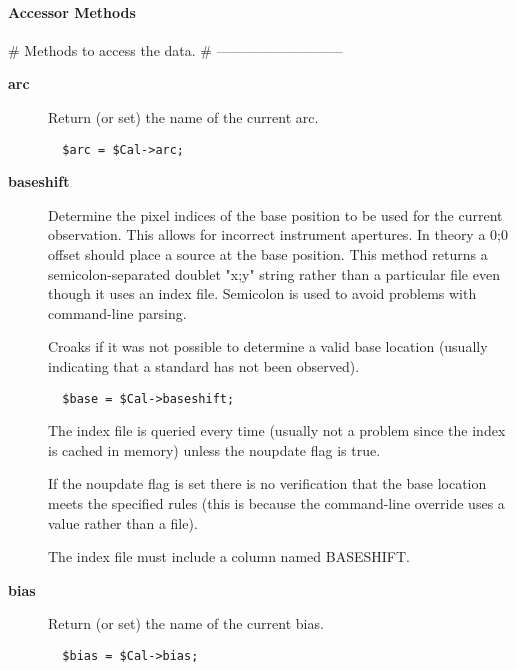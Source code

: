 \paragraph*{Accessor Methods\label{ORAC::Calib_Accessor_Methods}}


\# Methods to access the data.
\# ---------------------------

\begin{description}

\item[\textbf{arc}] \mbox{}

Return (or set) the name of the current arc.

\begin{verbatim}
  $arc = $Cal->arc;
\end{verbatim}

\item[\textbf{baseshift}] \mbox{}

Determine the pixel indices of the base position to be used for the
current observation.  This allows for incorrect instrument apertures.
In theory a 0;0 offset should place a source at the base position.
This method returns a semicolon-separated doublet "x;y" string rather
than a particular file even though it uses an index file.  Semicolon
is used to avoid problems with command-line parsing.



Croaks if it was not possible to determine a valid base location
(usually indicating that a standard has not been observed).

\begin{verbatim}
  $base = $Cal->baseshift;
\end{verbatim}


The index file is queried every time (usually not a problem since the
index is cached in memory) unless the noupdate flag is true.



If the noupdate flag is set there is no verification that the base
location meets the specified rules (this is because the command-line
override uses a value rather than a file).



The index file must include a column named BASESHIFT.


\item[\textbf{bias}] \mbox{}

Return (or set) the name of the current bias.

\begin{verbatim}
  $bias = $Cal->bias;
\end{verbatim}


\end{description}
